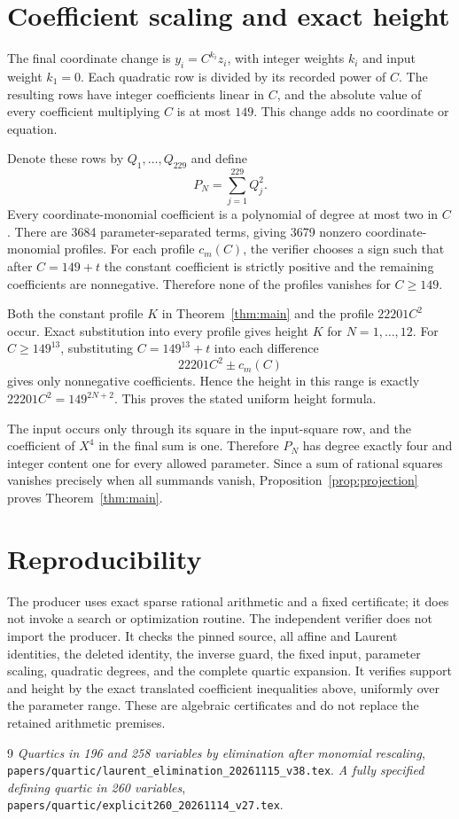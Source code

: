 \documentclass[11pt,a4paper]{article}
\begin{document}
\section{Coefficient scaling and exact height}

The final coordinate change is $y_i=C^{k_i}z_i$, with integer
weights $k_i$ and input weight $k_1=0$. Each quadratic row is divided
by its recorded power of $C$. The resulting rows have integer
coefficients linear in $C$, and the absolute value of every
coefficient multiplying $C$ is at most $149$. This change adds no
coordinate or equation.

Denote these rows by $Q_1,\ldots,Q_{229}$ and define
\[
                    P_N=\sum_{j=1}^{229}Q_j^2.
\]
Every coordinate-monomial coefficient is a polynomial of degree at
most two in $C$. There are 3684 parameter-separated terms, giving
3679 nonzero coordinate-monomial profiles. For each profile $c_m(C)$,
the verifier chooses a sign such that after $C=149+t$ the constant
coefficient is strictly positive and the remaining coefficients are
nonnegative. Therefore none of the profiles vanishes for $C\ge149$.

Both the constant profile $K$ in Theorem~\ref{thm:main} and the
profile $22201C^2$ occur. Exact substitution into every profile gives
height $K$ for $N=1,\ldots,12$. For $C\ge149^{13}$, substituting
$C=149^{13}+t$ into each difference
\[
                   22201C^2\pm c_m(C)
\]
gives only nonnegative coefficients. Hence the height in this range
is exactly $22201C^2=149^{2N+2}$. This proves the stated uniform
height formula.

The input occurs only through its square in the input-square row,
and the coefficient of $X^4$ in the final sum is one. Therefore
$P_N$ has degree exactly four and integer content one for every
allowed parameter. Since a sum of rational squares vanishes precisely
when all summands vanish, Proposition~\ref{prop:projection} proves
Theorem~\ref{thm:main}.

\section{Reproducibility}

The producer uses exact sparse rational arithmetic and a fixed
certificate; it does not invoke a search or optimization routine.
The independent verifier does not import the producer. It checks the
pinned source, all affine and Laurent identities, the deleted
identity, the inverse guard, the fixed input, parameter scaling,
quadratic degrees, and the complete quartic expansion. It verifies
support and height by the exact translated coefficient inequalities
above, uniformly over the parameter range. These are algebraic
certificates and do not replace the retained arithmetic premises.

\begin{thebibliography}{9}
\emph{Quartics in 196 and 258 variables by elimination after monomial
rescaling},
\nolinkurl{papers/quartic/laurent_elimination_20261115_v38.tex}.
\emph{A fully specified defining quartic in 260 variables},
\nolinkurl{papers/quartic/explicit260_20261114_v27.tex}.
\end{thebibliography}
\end{document}
